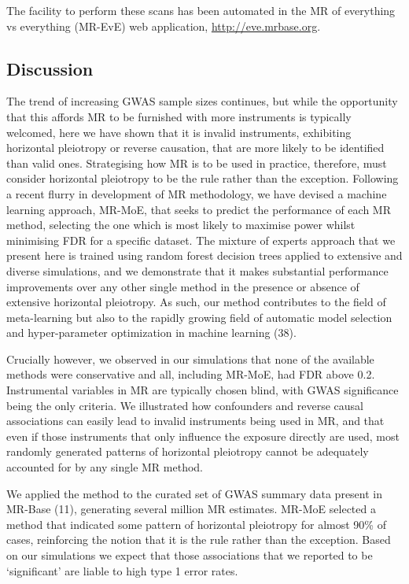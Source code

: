 \documentclass[]{article}
\begin{document}
The facility to perform these scans has been automated in the MR of
everything vs everything (MR-EvE) web application,
\url{http://eve.mrbase.org}.

\subsection{Discussion}\label{discussion}

The trend of increasing GWAS sample sizes continues, but while the
opportunity that this affords MR to be furnished with more instruments
is typically welcomed, here we have shown that it is invalid
instruments, exhibiting horizontal pleiotropy or reverse causation, that
are more likely to be identified than valid ones. Strategising how MR is
to be used in practice, therefore, must consider horizontal pleiotropy
to be the rule rather than the exception. Following a recent flurry in
development of MR methodology, we have devised a machine learning
approach, MR-MoE, that seeks to predict the performance of each MR
method, selecting the one which is most likely to maximise power whilst
minimising FDR for a specific dataset. The mixture of experts approach
that we present here is trained using random forest decision trees
applied to extensive and diverse simulations, and we demonstrate that it
makes substantial performance improvements over any other single method
in the presence or absence of extensive horizontal pleiotropy. As such,
our method contributes to the field of meta-learning but also to the
rapidly growing field of automatic model selection and hyper-parameter
optimization in machine learning (38).

Crucially however, we observed in our simulations that none of the
available methods were conservative and all, including MR-MoE, had FDR
above 0.2. Instrumental variables in MR are typically chosen blind, with
GWAS significance being the only criteria. We illustrated how
confounders and reverse causal associations can easily lead to invalid
instruments being used in MR, and that even if those instruments that
only influence the exposure directly are used, most randomly generated
patterns of horizontal pleiotropy cannot be adequately accounted for by
any single MR method.

We applied the method to the curated set of GWAS summary data present in
MR-Base (11), generating several million MR estimates. MR-MoE selected a
method that indicated some pattern of horizontal pleiotropy for almost
90\% of cases, reinforcing the notion that it is the rule rather than
the exception. Based on our simulations we expect that those
associations that we reported to be `significant' are liable to high
type 1 error rates.
\end{document}
